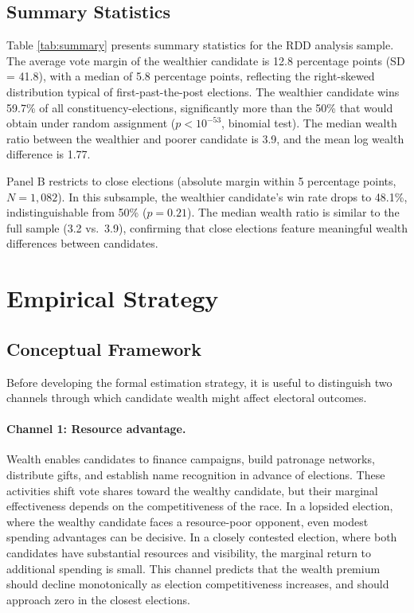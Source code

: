 \documentclass[12pt]{article}
\begin{document}
\subsection{Summary Statistics}



Table \ref{tab:summary} presents summary statistics for the RDD analysis sample. The average vote margin of the wealthier candidate is 12.8 percentage points (SD = 41.8), with a median of 5.8 percentage points, reflecting the right-skewed distribution typical of first-past-the-post elections. The wealthier candidate wins 59.7\% of all constituency-elections, significantly more than the 50\% that would obtain under random assignment ($p < 10^{-53}$, binomial test). The median wealth ratio between the wealthier and poorer candidate is 3.9, and the mean log wealth difference is 1.77.

Panel B restricts to close elections (absolute margin within 5 percentage points, $N = 1{,}082$). In this subsample, the wealthier candidate's win rate drops to 48.1\%, indistinguishable from 50\% ($p = 0.21$). The median wealth ratio is similar to the full sample (3.2 vs.\ 3.9), confirming that close elections feature meaningful wealth differences between candidates.


\section{Empirical Strategy}

\subsection{Conceptual Framework}

Before developing the formal estimation strategy, it is useful to distinguish two channels through which candidate wealth might affect electoral outcomes.

\paragraph{Channel 1: Resource advantage.} Wealth enables candidates to finance campaigns, build patronage networks, distribute gifts, and establish name recognition in advance of elections. These activities shift vote shares toward the wealthy candidate, but their marginal effectiveness depends on the competitiveness of the race. In a lopsided election, where the wealthy candidate faces a resource-poor opponent, even modest spending advantages can be decisive. In a closely contested election, where both candidates have substantial resources and visibility, the marginal return to additional spending is small. This channel predicts that the wealth premium should decline monotonically as election competitiveness increases, and should approach zero in the closest elections.
\end{document}
